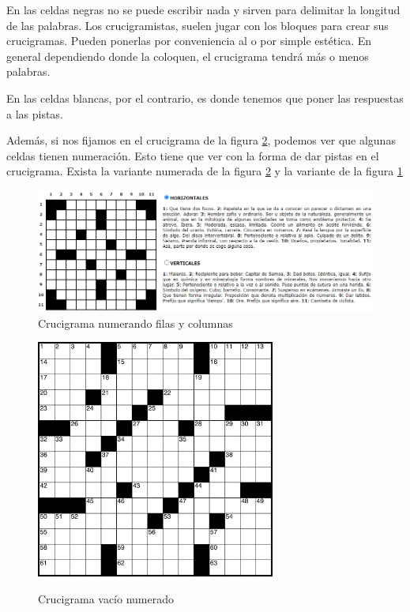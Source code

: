\documentclass[12pt, a4paper]{article}
\begin{document}
En las celdas negras no se puede escribir nada y sirven para delimitar
la longitud de las palabras. Los crucigramistas, suelen jugar con los bloques
para crear sus crucigramas. Pueden ponerlas por conveniencia al  o por simple
estética. En general dependiendo donde la coloquen, el crucigrama tendrá más
o menos palabras.

En las celdas blancas, por el contrario, es donde tenemos que poner las
respuestas a las pistas. 

Además, si nos fijamos en el crucigrama de la figura
\ref{fig:americanXword}, podemos ver que algunas celdas tienen numeración. Esto tiene
que ver con la forma de dar pistas en el crucigrama. Exista la variante numerada
de la figura \ref{fig:americanXword} y la variante de la figura \ref{fig:xwordESP}

\begin{figure}[p]
	\centering
	\includegraphics[width=\textwidth]{img/xword-weird.png}
	\caption{Crucigrama numerando filas y columnas}
	\label{fig:xwordESP}
\end{figure}

\begin{figure}[p]
	\centering
	\includegraphics[width=0.7\textwidth]{img/CrosswordUSA.png}
	\label{fig:americanXword}
	\caption{Crucigrama vacío numerado}
\end{figure}
\end{document}
